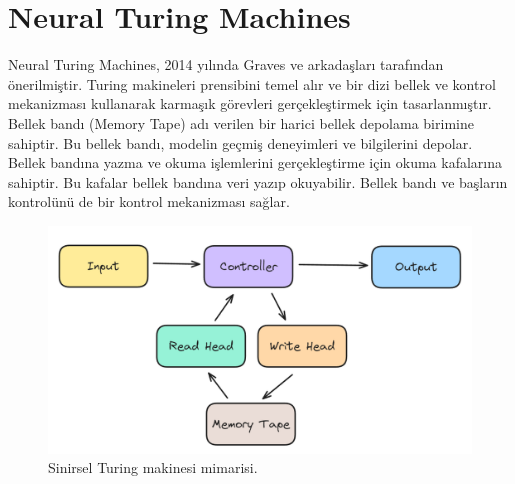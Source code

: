 \section{Neural Turing Machines}
Neural Turing Machines, 2014 yılında Graves ve arkadaşları tarafından önerilmiştir. Turing makineleri prensibini temel alır ve bir dizi bellek ve kontrol mekanizması kullanarak karmaşık görevleri gerçekleştirmek için tasarlanmıştır. Bellek bandı (Memory Tape) adı verilen bir harici bellek depolama birimine sahiptir. Bu bellek bandı, modelin geçmiş deneyimleri ve bilgilerini depolar. Bellek bandına yazma ve okuma işlemlerini gerçekleştirme için okuma kafalarına sahiptir. Bu kafalar bellek bandına veri yazıp okuyabilir. Bellek bandı ve  başların kontrolünü de bir kontrol mekanizması sağlar.

\begin{figure}[h]
    \centering
    \includegraphics[width=1\textwidth]{images/neural_tuning_machines.png}
    \caption{Sinirsel Turing makinesi mimarisi.}
    \label{fig:enter-label}
\end{figure}

\newpage